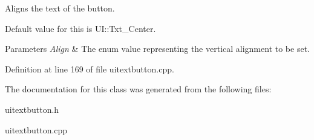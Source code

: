 Aligns the text of the button. 

Default value for this is UI::Txt\_\-Center. 
\begin{DoxyParams}{Parameters}
{\em Align} & The enum value representing the vertical alignment to be set. \\
\hline
\end{DoxyParams}


Definition at line 169 of file uitextbutton.cpp.



The documentation for this class was generated from the following files:\begin{DoxyCompactItemize}
\item 
uitextbutton.h\item 
uitextbutton.cpp\end{DoxyCompactItemize}
